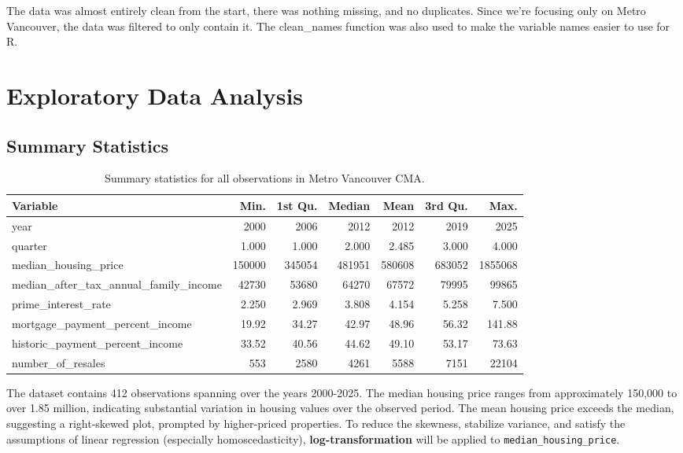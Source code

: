 \documentclass[10pt]{article}
\begin{document}
The data was almost entirely clean from the start, there was nothing missing, and no duplicates. Since we're focusing only on Metro Vancouver, the data was filtered to only contain it. The clean\_names function was also used to make the variable names easier to use for R.

\section*{Exploratory Data Analysis}

\subsection*{Summary Statistics}

\begin{table}[H]
\centering
\begin{tabular}{lrrrrrr}
\toprule
Variable & Min. & 1st Qu. & Median & Mean & 3rd Qu. & Max. \\
\midrule
year & 2000 & 2006 & 2012 & 2012 & 2019 & 2025 \\
quarter & 1.000 & 1.000 & 2.000 & 2.485 & 3.000 & 4.000 \\
median\_housing\_price & 150000 & 345054 & 481951 & 580608 & 683052 & 1855068 \\
median\_after\_tax\_annual\_family\_income & 42730 & 53680 & 64270 & 67572 & 79995 & 99865 \\
prime\_interest\_rate & 2.250 & 2.969 & 3.808 & 4.154 & 5.258 & 7.500 \\
mortgage\_payment\_percent\_income & 19.92 & 34.27 & 42.97 & 48.96 & 56.32 & 141.88 \\
historic\_payment\_percent\_income & 33.52 & 40.56 & 44.62 & 49.10 & 53.17 & 73.63 \\
number\_of\_resales & 553 & 2580 & 4261 & 5588 & 7151 & 22104 \\
\bottomrule
\end{tabular}
\caption{Summary statistics for all observations in Metro Vancouver CMA.}
\end{table}
The dataset contains 412 observations spanning over the years 2000-2025. The median housing price ranges from approximately 150,000 to over 1.85 million, indicating substantial variation in housing values over the observed period. 
The mean housing price exceeds the median, suggesting a right-skewed plot, prompted by higher-priced properties. To reduce the skewness, stabilize variance, and satisfy the assumptions of linear regression (especially homoscedasticity), \textbf{log-transformation} will be applied to \texttt{median\_housing\_price}.
\end{document}
